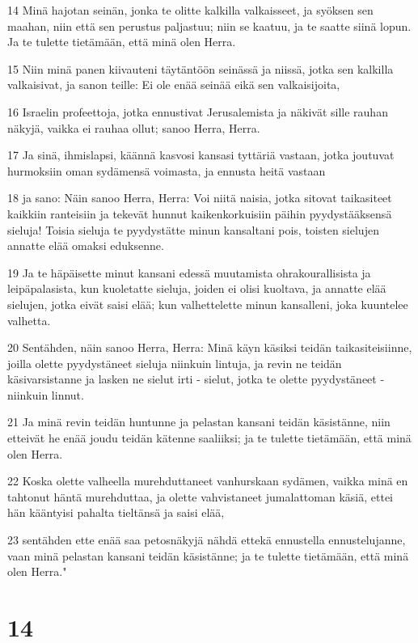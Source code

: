 \par 14 Minä hajotan seinän, jonka te olitte kalkilla valkaisseet, ja syöksen sen maahan, niin että sen perustus paljastuu; niin se kaatuu, ja te saatte siinä lopun. Ja te tulette tietämään, että minä olen Herra.
\par 15 Niin minä panen kiivauteni täytäntöön seinässä ja niissä, jotka sen kalkilla valkaisivat, ja sanon teille: Ei ole enää seinää eikä sen valkaisijoita,
\par 16 Israelin profeettoja, jotka ennustivat Jerusalemista ja näkivät sille rauhan näkyjä, vaikka ei rauhaa ollut; sanoo Herra, Herra.
\par 17 Ja sinä, ihmislapsi, käännä kasvosi kansasi tyttäriä vastaan, jotka joutuvat hurmoksiin oman sydämensä voimasta, ja ennusta heitä vastaan
\par 18 ja sano: Näin sanoo Herra, Herra: Voi niitä naisia, jotka sitovat taikasiteet kaikkiin ranteisiin ja tekevät hunnut kaikenkorkuisiin päihin pyydystääksensä sieluja! Toisia sieluja te pyydystätte minun kansaltani pois, toisten sielujen annatte elää omaksi eduksenne.
\par 19 Ja te häpäisette minut kansani edessä muutamista ohrakourallisista ja leipäpalasista, kun kuoletatte sieluja, joiden ei olisi kuoltava, ja annatte elää sielujen, jotka eivät saisi elää; kun valhettelette minun kansalleni, joka kuuntelee valhetta.
\par 20 Sentähden, näin sanoo Herra, Herra: Minä käyn käsiksi teidän taikasiteisiinne, joilla olette pyydystäneet sieluja niinkuin lintuja, ja revin ne teidän käsivarsistanne ja lasken ne sielut irti - sielut, jotka te olette pyydystäneet - niinkuin linnut.
\par 21 Ja minä revin teidän huntunne ja pelastan kansani teidän käsistänne, niin etteivät he enää joudu teidän kätenne saaliiksi; ja te tulette tietämään, että minä olen Herra.
\par 22 Koska olette valheella murehduttaneet vanhurskaan sydämen, vaikka minä en tahtonut häntä murehduttaa, ja olette vahvistaneet jumalattoman käsiä, ettei hän kääntyisi pahalta tieltänsä ja saisi elää,
\par 23 sentähden ette enää saa petosnäkyjä nähdä ettekä ennustella ennustelujanne, vaan minä pelastan kansani teidän käsistänne; ja te tulette tietämään, että minä olen Herra."

\chapter{14}

